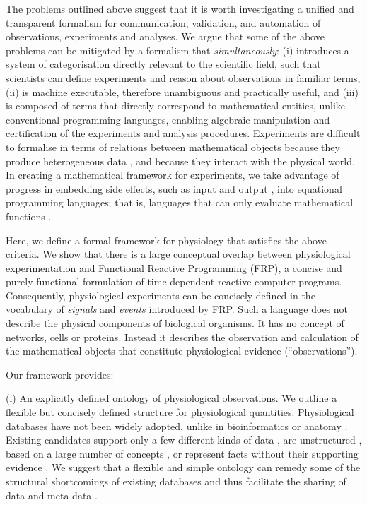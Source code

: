The problems outlined above suggest that it is worth investigating a
unified and transparent formalism for communication, validation, and
automation of observations, experiments and analyses. We argue that
some of the above problems can be mitigated by a formalism that
\emph{simultaneously}: (i) introduces a system of categorisation
directly relevant to the scientific field, such that scientists can
define experiments and reason about observations in familiar terms,
(ii) is machine executable, therefore unambiguous and practically
useful, and (iii) is composed of terms that directly correspond to
mathematical entities, unlike conventional programming languages,
enabling algebraic manipulation and certification of the experiments
and analysis procedures.  Experiments are difficult to formalise in
terms of relations between mathematical objects because they
produce heterogeneous data \citep{Tukey1962}, and because they
interact with the physical world. In creating a mathematical framework
for experiments, we take advantage of progress in embedding side
effects, such as input and output \citep{PeytonJones2002, Roy2004,
  Wadler1995}, into equational programming languages; that is, languages
that can only evaluate mathematical functions \citep{Church1941}.

Here, we define a formal framework for physiology
that satisfies the above criteria. We show that there
is a large conceptual overlap between physiological experimentation
and Functional Reactive Programming (FRP\citep{Elliott1997,
  Nilsson2002}), a concise and purely functional formulation of
time-dependent reactive computer programs. Consequently, physiological
experiments can be concisely defined in the vocabulary of
\emph{signals} and \emph{events} introduced by FRP. Such a language
does not describe the physical components of biological organisms. It
has no concept of networks, cells or proteins. Instead it describes
the observation and calculation of the mathematical objects that
constitute physiological evidence (``observations'').

Our framework provides:

(i) An explicitly defined ontology of physiological observations. We
outline a flexible but concisely defined structure for physiological
quantities.  Physiological databases have not been widely adopted,
unlike in bioinformatics or anatomy \citep{Herz2008,
  Amari2002}. Existing candidates support only a few different kinds
of data \citep{Jessop2010}, are unstructured \citep{Teeters2008},
based on a large number of concepts \citep{Frishkoff2009}, or represent
facts without their supporting evidence \citep{Katz2010}.
We suggest that a flexible and simple ontology can remedy some of the
structural shortcomings\citep{Gardner2005, Amari2002} of existing
databases and thus facilitate the sharing of data and meta-data
\citep{Insel2003}.

